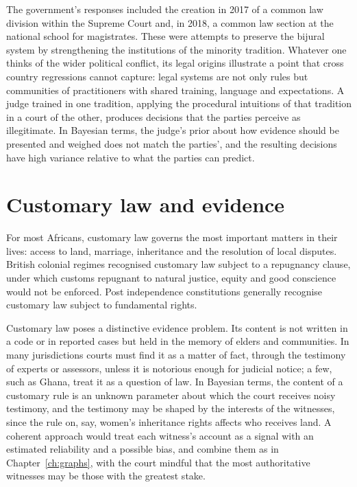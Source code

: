 The government's responses included the creation in 2017 of a common law division within the Supreme Court and, in 2018, a common law section at the national school for magistrates. These were attempts to preserve the bijural system by strengthening the institutions of the minority tradition. Whatever one thinks of the wider political conflict, its legal origins illustrate a point that cross country regressions cannot capture: legal systems are not only rules but communities of practitioners with shared training, language and expectations. A judge trained in one tradition, applying the procedural intuitions of that tradition in a court of the other, produces decisions that the parties perceive as illegitimate. In Bayesian terms, the judge's prior about how evidence should be presented and weighed does not match the parties', and the resulting decisions have high variance relative to what the parties can predict.

\section{Customary law and evidence}

For most Africans, customary law governs the most important matters in their lives: access to land, marriage, inheritance and the resolution of local disputes. British colonial regimes recognised customary law subject to a repugnancy clause, under which customs repugnant to natural justice, equity and good conscience would not be enforced. Post independence constitutions generally recognise customary law subject to fundamental rights.

Customary law poses a distinctive evidence problem. Its content is not written in a code or in reported cases but held in the memory of elders and communities. In many jurisdictions courts must find it as a matter of fact, through the testimony of experts or assessors, unless it is notorious enough for judicial notice; a few, such as Ghana, treat it as a question of law. In Bayesian terms, the content of a customary rule is an unknown parameter about which the court receives noisy testimony, and the testimony may be shaped by the interests of the witnesses, since the rule on, say, women's inheritance rights affects who receives land. A coherent approach would treat each witness's account as a signal with an estimated reliability and a possible bias, and combine them as in Chapter~\ref{ch:graphs}, with the court mindful that the most authoritative witnesses may be those with the greatest stake.

